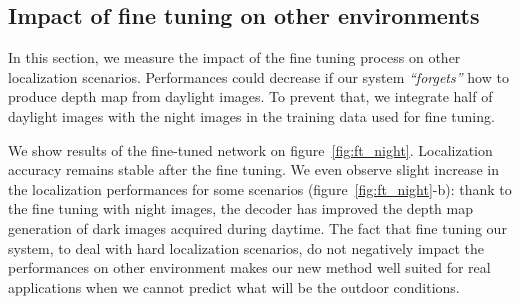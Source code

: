 



\subsection{Impact of fine tuning on other environments}
\label{subsec:night2day_inf}
In this section, we measure the impact of the fine tuning process on other localization scenarios. Performances could decrease if our system \textit{``forgets''} how to produce depth map from daylight images. To prevent that, we integrate half of daylight images with the night images in the training data used for fine tuning. 

We show results of the fine-tuned network on figure~\ref{fig:ft_night}. Localization accuracy remains stable after the fine tuning. We even observe slight increase in the localization performances for some scenarios (figure~\ref{fig:ft_night}-b): thank to the fine tuning with night images, the decoder has improved the depth map generation of dark images acquired during daytime. The fact that fine tuning our system, to deal with hard localization scenarios, do not negatively impact the performances on other environment makes our new method well suited for real applications when we cannot predict what will be the outdoor conditions.



